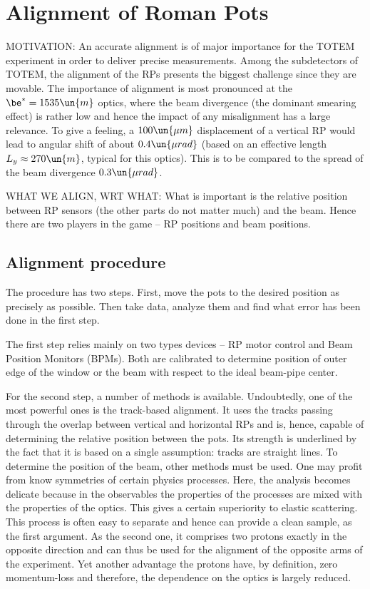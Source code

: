 \chapter[alignment]{Alignment of Roman Pots}

MOTIVATION: An accurate alignment is of major importance for the TOTEM experiment in order to deliver precise measurements. Among the subdetectors of TOTEM, the alignment of the RPs presents the biggest challenge since they are movable. The importance of alignment is most pronounced at the $\be^* = 1535\un{m}$ optics, where the beam divergence (the dominant smearing effect) is rather low and hence the impact of any misalignment has a large relevance. To give a feeling, a $100\un{\mu m}$ displacement of a vertical RP would lead to angular shift of about $0.4\un{\mu rad}$ (based on an effective length $L_y\approx 270\un{m}$, typical for this optics). This is to be compared to the spread of the beam divergence $0.3\un{\mu rad}$.


WHAT WE ALIGN, WRT WHAT:
What is important is the relative position between RP sensors (the other parts do not matter much) and the beam. Hence there are two players in the game -- RP positions and beam positions.

\section[alignment procedure]{Alignment procedure}
The procedure has two steps. First, move the pots to the desired position as precisely as possible. Then take data, analyze them and find what error has been done in the first step.

The first step relies mainly on two types devices -- RP motor control and Beam Position Monitors (BPMs). Both are calibrated to determine position of outer edge of the window or the beam with respect to the ideal beam-pipe center.

For the second step, a number of methods is available. Undoubtedly, one of the most powerful ones is the track-based alignment. It uses the tracks passing through the overlap between vertical and horizontal RPs and is, hence, capable of determining the relative position between the pots. Its strength is underlined by the fact that it is based on a single assumption: tracks are straight lines. To determine the position of the beam, other methods must be used. One may profit from know symmetries of certain physics processes. Here, the analysis becomes delicate because in the observables the properties of the processes are mixed with the properties of the optics. This gives a certain superiority to elastic scattering. This process is often easy to separate and hence can provide a clean sample, as the first argument. As the second one, it comprises two protons exactly in the opposite direction and can thus be used for the alignment of the opposite arms of the experiment. Yet another advantage the protons have, by definition, zero momentum-loss and therefore, the dependence on the optics is largely reduced.

